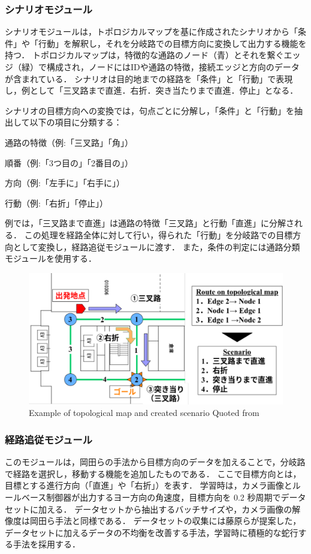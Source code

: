 \subsubsection{シナリオモジュール}
シナリオモジュールは，トポロジカルマップを基に作成されたシナリオから「条件」や「行動」を解釈し，それを分岐路での目標方向に変換して出力する機能を持つ．
トポロジカルマップは，特徴的な通路のノード（青）とそれを繋ぐエッジ（緑）で構成され，ノードにはIDや通路の特徴，接続エッジと方向のデータが含まれている．
シナリオは目的地までの経路を「条件」と「行動」で表現し，例として「三叉路まで直進．右折．突き当たりまで直進．停止」となる．

シナリオの目標方向への変換では，句点ごとに分解し，「条件」と「行動」を抽出して以下の項目に分類する：

通路の特徴（例:「三叉路」「角」）

順番（例:「3つ目の」「2番目の」）

方向（例:「左手に」「右手に」）

行動（例:「右折」「停止」）

例では，「三叉路まで直進」は通路の特徴「三叉路」と行動「直進」に分解される．
この処理を経路全体に対して行い，得られた「行動」を分岐路での目標方向として変換し，経路追従モジュールに渡す．
また，条件の判定には通路分類モジュールを使用する．

\begin{figure}[htbp]
  \centering
   \includegraphics[width=130mm]{images/pdf/haruyama/scenario.pdf}
   \caption{ Example of topological map and created scenario Quoted from \cite{haruyama2023}}
   \label{fig:scenario}
\end{figure}

\clearpage
\subsubsection{経路追従モジュール}
このモジュールは，岡田らの手法から目標方向のデータを加えることで，分岐路で経路を選択し，移動する機能を追加したものである．
ここで目標方向とは，目標とする進行方向（「直進」や「右折」）を表す．
学習時は，カメラ画像とルールベース制御器が出力するヨー方向の角速度，目標方向を 0.2 秒周期でデータセットに加える．
データセットから抽出するバッチサイズや，カメラ画像の解像度は岡田ら手法と同様である．
データセットの収集には藤原らが提案した，データセットに加えるデータの不均衡を改善する手法，学習時に積極的な蛇行する手法を採用する．

